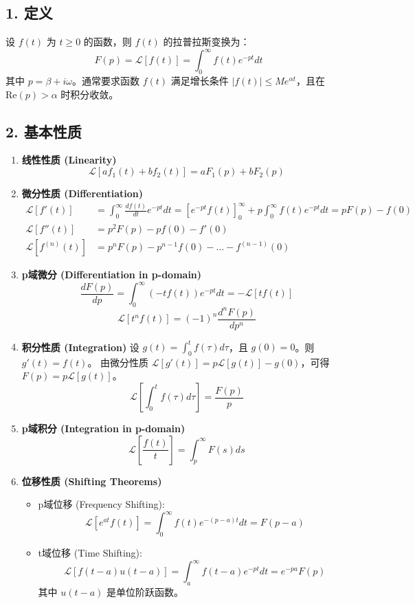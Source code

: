 \documentclass{article}
\begin{document}
	\subsection*{1. 定义}
	设 $f(t)$ 为 $t \ge 0$ 的函数，则 $f(t)$ 的拉普拉斯变换为：
	$$ 
	F(p) = \mathcal{L}[f(t)] = \int_0^\infty f(t) e^{-pt} dt 
	$$
	其中 $p = \beta + i\omega$。通常要求函数 $f(t)$ 满足增长条件 $|f(t)| \le M e^{\alpha t}$，且在 $\text{Re}(p) > \alpha$ 时积分收敛。
	
	\subsection*{2. 基本性质}
	\begin{enumerate}
		\item \textbf{线性性质 (Linearity)}
		$$ \mathcal{L}[af_1(t) + bf_2(t)] = aF_1(p) + bF_2(p) $$
		
		\item \textbf{微分性质 (Differentiation)}
		\begin{align*}
			\mathcal{L}[f'(t)] &= \int_0^\infty \frac{df(t)}{dt} e^{-pt} dt = [e^{-pt}f(t)]_0^\infty + p \int_0^\infty f(t)e^{-pt} dt = pF(p) - f(0) \\
			\mathcal{L}[f''(t)] &= p^2F(p) - pf(0) - f'(0) \\
			\mathcal{L}[f^{(n)}(t)] &= p^n F(p) - p^{n-1}f(0) - \dots - f^{(n-1)}(0)
		\end{align*}
		
		\item \textbf{p域微分 (Differentiation in p-domain)}
		$$ \frac{dF(p)}{dp} = \int_0^\infty (-t f(t)) e^{-pt} dt = -\mathcal{L}[tf(t)] $$
		$$ \mathcal{L}[t^n f(t)] = (-1)^n \frac{d^n F(p)}{dp^n} $$
		
		\item \textbf{积分性质 (Integration)}
		设 $g(t) = \int_0^t f(\tau) d\tau$，且 $g(0)=0$。则 $g'(t)=f(t)$。
		由微分性质 $\mathcal{L}[g'(t)] = p\mathcal{L}[g(t)] - g(0)$，可得 $F(p) = p\mathcal{L}[g(t)]$。
		$$ \mathcal{L}\left[\int_0^t f(\tau) d\tau\right] = \frac{F(p)}{p} $$
		
		\item \textbf{p域积分 (Integration in p-domain)}
		$$ \mathcal{L}\left[\frac{f(t)}{t}\right] = \int_p^\infty F(s) ds $$
		
		\item \textbf{位移性质 (Shifting Theorems)}
		\begin{itemize}
			\item p域位移 (Frequency Shifting):
			$$ \mathcal{L}[e^{at}f(t)] = \int_0^\infty f(t) e^{-(p-a)t} dt = F(p-a) $$
			\item t域位移 (Time Shifting):
			$$ \mathcal{L}[f(t-a)u(t-a)] = \int_a^\infty f(t-a)e^{-pt}dt = e^{-pa}F(p) $$
			其中 $u(t-a)$ 是单位阶跃函数。
		\end{itemize}
		

\end{enumerate}
\end{document}
